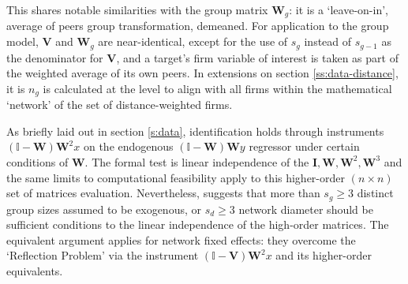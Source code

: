 %
This shares notable similarities with the group matrix $\mathbf W_g$:
it is a `leave-on-in', average of peers group transformation, demeaned.
For application to the group model, $\mathbf V$ and $\mathbf W_g$
are near-identical, except for the use of $s_g$ instead of $s_{g-1}$
as the denominator for $\mathbf V$, and a target's firm variable of interest
is taken as part of the weighted average of its own peers.
In extensions on section \ref{ss:data-distance},
it is $n_g$ is calculated at the  level
to align with all firms within the mathematical `network' of the set of
distance-weighted firms.
\par
As briefly laid out in section \ref{s:data},
identification holds through instruments $(\mathbb I-\mathbf W)\mathbf W^2x$
on the endogenous $(\mathbb I-\mathbf W)\mathbf Wy$ regressor
under certain conditions of $\mathbf W$.
The formal test is linear independence of the $\mathbf I, \mathbf W, \mathbf W^2, \mathbf W^3$
and the same limits to computational feasibility apply to this higher-order $(n\times n)$ set of matrices evaluation.
Nevertheless, \cite{Bramoulle2009} suggests that more than $s_g\geq 3$ distinct group sizes
assumed to be exogenous, or $s_d \geq 3$ network diameter
should be sufficient conditions to the linear independence of the high-order matrices.
The equivalent argument applies for  network fixed effects:
they overcome the `Reflection Problem' via the instrument $(\mathbb I-\mathbf V)\mathbf W^2x$
and its higher-order equivalents.

